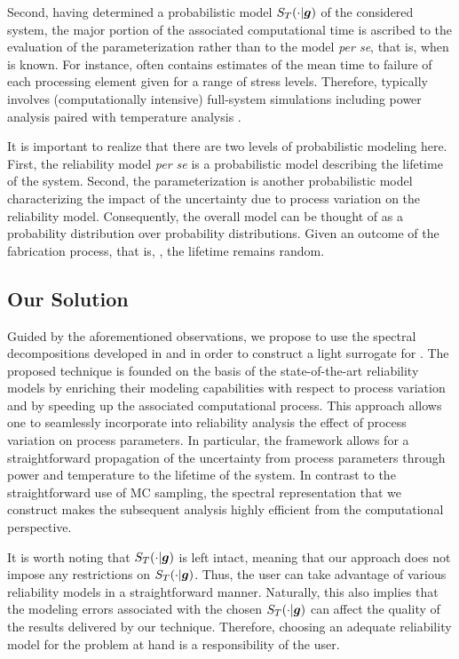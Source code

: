 Second, having determined a probabilistic model $S_T(\cdot | \boldsymbol{g})$ of the
considered system, the major portion of the associated computational time is
ascribed to the evaluation of the parameterization \vg rather than to the model
\emph{per se}, that is, when \vg is known. For instance, \vg often contains
estimates of the mean time to failure of each processing element given for a
range of stress levels. Therefore, \vg typically involves (computationally
intensive) full-system simulations including power analysis paired with
temperature analysis \cite{xiang2010}.

\begin{remark}
It is important to realize that there are two levels of probabilistic modeling
here. First, the reliability model \emph{per se} is a probabilistic model
describing the lifetime of the system. Second, the parameterization \vg is
another probabilistic model characterizing the impact of the uncertainty due to
process variation on the reliability model. Consequently, the overall model can
be thought of as a probability distribution over probability distributions.
Given an outcome of the fabrication process, that is, \vg, the lifetime remains
random.
\end{remark}

\subsection{Our Solution}

Guided by the aforementioned observations, we propose to use the spectral
decompositions developed in  and
 in order to construct a light surrogate for \vg. The
proposed technique is founded on the basis of the state-of-the-art reliability
models by enriching their modeling capabilities with respect to process
variation and by speeding up the associated computational process. This approach
allows one to seamlessly incorporate into reliability analysis the effect of
process variation on process parameters. In particular, the framework allows for
a straightforward propagation of the uncertainty from process parameters through
power and temperature to the lifetime of the system. In contrast to the
straightforward use of \ac{MC} sampling, the spectral representation that we
construct makes the subsequent analysis highly efficient from the computational
perspective.

It is worth noting that $S_T(\cdot | \boldsymbol{g})$ is left intact, meaning that our
approach does not impose any restrictions on $S_T(\cdot | \boldsymbol{g})$. Thus, the user
can take advantage of various reliability models in a straightforward manner.
Naturally, this also implies that the modeling errors associated with the chosen
$S_T(\cdot | \boldsymbol{g})$ can affect the quality of the results delivered by our
technique. Therefore, choosing an adequate reliability model for the problem at
hand is a responsibility of the user.

